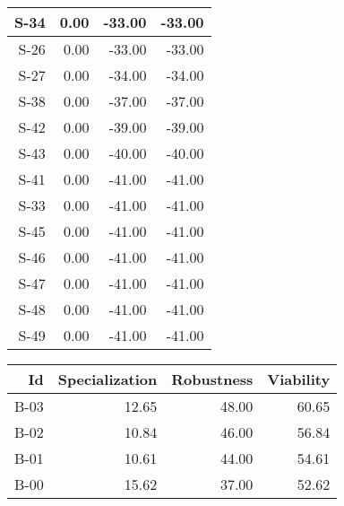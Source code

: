 \begin{tabular}{ | r | r | r | r | }
    \hline
                  S-34  &            0.00  &          -33.00  &          -33.00  \\
    \hline
                  S-26  &            0.00  &          -33.00  &          -33.00  \\
    \hline
                  S-27  &            0.00  &          -34.00  &          -34.00  \\
    \hline
                  S-38  &            0.00  &          -37.00  &          -37.00  \\
    \hline
                  S-42  &            0.00  &          -39.00  &          -39.00  \\
    \hline
                  S-43  &            0.00  &          -40.00  &          -40.00  \\
    \hline
                  S-41  &            0.00  &          -41.00  &          -41.00  \\
    \hline
                  S-33  &            0.00  &          -41.00  &          -41.00  \\
    \hline
                  S-45  &            0.00  &          -41.00  &          -41.00  \\
    \hline
                  S-46  &            0.00  &          -41.00  &          -41.00  \\
    \hline
                  S-47  &            0.00  &          -41.00  &          -41.00  \\
    \hline
                  S-48  &            0.00  &          -41.00  &          -41.00  \\
    \hline
                  S-49  &            0.00  &          -41.00  &          -41.00  \\
    \hline
\end{tabular}


\begin{tabular}{ | r | r | r | r | }
    \hline
                    Id  &  Specialization  &      Robustness  &       Viability  \\
    \hline
    \hline
                  B-03  &           12.65  &           48.00  &           60.65  \\
    \hline
                  B-02  &           10.84  &           46.00  &           56.84  \\
    \hline
                  B-01  &           10.61  &           44.00  &           54.61  \\
    \hline
                  B-00  &           15.62  &           37.00  &           52.62  \\
    \hline
\end{tabular}


